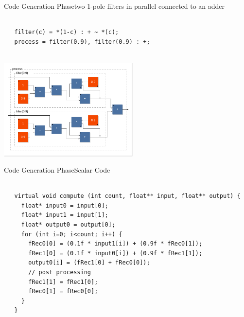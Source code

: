  
\begin{frame}[fragile]{Code Generation Phase}{two 1-pole filters in parallel connected to an adder}
\begin{lstlisting}[basicstyle=\ttfamily\tiny\color{yotxt}]

   filter(c) = *(1-c) : + ~ *(c);
   process = filter(0.9), filter(0.9) : +;
   
\end{lstlisting}
   
\begin{center}
\includegraphics[width=7cm]{images/filter2.pdf}
\end{center}
\end{frame}
 

 
\begin{frame}[fragile]{Code Generation Phase}{Scalar Code}
\begin{lstlisting}[basicstyle=\ttfamily\tiny\color{yotxt}]

   virtual void compute (int count, float** input, float** output) {
     float* input0 = input[0];
     float* input1 = input[1];
     float* output0 = output[0];
     for (int i=0; i<count; i++) {
       fRec0[0] = (0.1f * input1[i]) + (0.9f * fRec0[1]);
       fRec1[0] = (0.1f * input0[i]) + (0.9f * fRec1[1]);
       output0[i] = (fRec1[0] + fRec0[0]);
       // post processing
       fRec1[1] = fRec1[0];
       fRec0[1] = fRec0[0];
     }
   }
   
\end{lstlisting}
\end{frame}
 
 			


